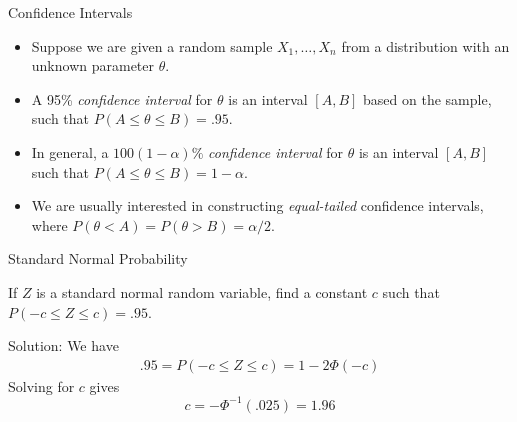 \documentclass[t,handout]{beamer}
\begin{document}
\begin{frame}{Confidence Intervals}
    \begin{itemize}
    \item Suppose we are given a random sample $X_1,\dots,X_n$ from a distribution with an unknown parameter $\theta$.
    \pause \item A 95\% \emph{confidence interval} for $\theta$ is an interval $[A,B]$ based on the sample, such that $P(A \leq \theta \leq B)=.95$.
    \pause \item In general, a $100(1-\alpha)\%$ \emph{confidence interval} for $\theta$ is an interval $[A,B]$ such that $P(A \leq \theta \leq B)=1-\alpha$.
    \pause \item We are usually interested in constructing \emph{equal-tailed} confidence intervals, where $P(\theta<A)=P(\theta>B)=\alpha/2$.
    \end{itemize}
    \end{frame}

\begin{frame}{Standard Normal Probability}
    \begin{block}{}
    If $Z$ is a standard normal random variable, find a constant $c$ such that $P(-c \leq Z \leq c)=.95$.
    \end{block}
    \pause Solution: We have
    \begin{align*}
    .95 = P(-c \leq Z \leq c) = 1-2\Phi(-c)
    \end{align*}
    \pause Solving for $c$ gives
    $$c = -\Phi^{-1}(.025) = 1.96$$
    \end{frame}
    
\end{document}
